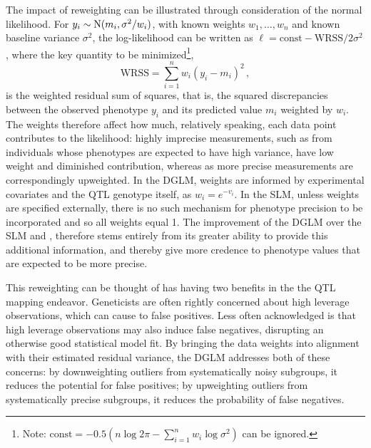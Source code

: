 The impact of reweighting can be illustrated through consideration of the normal likelihood. For $y_i\sim\mathrm{N}(m_i, \sigma^2/w_i)$, with known weights $w_1,\dots,w_n$ and known baseline variance $\sigma^2$, the log-likelihood can be written as $\ell = \text{const} - \text{WRSS}/2\sigma^2$, where
 the key quantity to be minimized\footnote{Note: $\text{const}=- 0.5(n\log2\pi -\sum^n_{i=1}w_i\log\sigma^2)$ can be ignored.}, 
\[
  \text{WRSS} = \sum^n_{i=1} w_i (y_i - m_i)^2 \,,
\]
is the weighted residual sum of squares, that is, the squared discrepancies between the observed phenotype $y_i$ and its predicted value $m_i$ weighted by $w_i$.
The weights therefore affect how much, relatively speaking, each data point contributes to the likelihood: highly imprecise measurements, such as from individuals whose phenotypes are expected to have high variance, have low weight and diminished contribution, whereas as more precise measurements are correspondingly upweighted.
In the DGLM, weights are informed by experimental covariates and the QTL genotype itself, as $w_i=e^{-v_i}$.
In the SLM, unless weights are specified externally, there is no such mechanism for phenotype precision to be incorporated and so all weights equal 1. The improvement of the DGLM over the SLM and \Caom, therefore stems entirely from its greater ability to provide this additional information, and thereby give more credence to phenotype values that are expected to be more precise.

This reweighting can be thought of has having two benefits in the the QTL mapping endeavor.
Geneticists are often rightly concerned about high leverage observations, which can cause to false positives.
Less often acknowledged is that high leverage observations may also induce false negatives, disrupting an otherwise good statistical model fit.
By bringing the data weights into alignment with their estimated residual variance, the DGLM addresses both of these concerns: by downweighting outliers from systematically noisy subgroups, it reduces the potential for false positives;
by upweighting outliers from systematically precise subgroups, it reduces the probability of false negatives.





